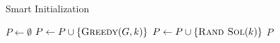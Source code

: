 \begin{algorithm}[h]
  \caption{Smart Initialization}\label{alg:GENETIKUS-ALGORITMUS:SMART-INIT}
  \begin{algorithmic}[1]
    \State $P \leftarrow \emptyset$
    \State $P \leftarrow P \cup  \left\{ \Call{Greedy}{G, k} \right\}$
    \EndFor
    \State $P \leftarrow P \cup  \left\{ \Call{Rand Sol}{k} \right\}$
    \EndWhile
    \State \Return $P$
    \EndFunction
  \end{algorithmic}
\end{algorithm}
